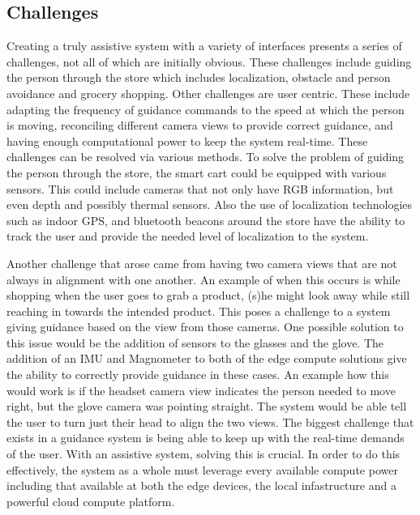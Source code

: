 \subsection{Challenges}
Creating a truly assistive system with a variety of interfaces presents a series 
of challenges, not all of which are initially obvious. These challenges include guiding the person
through the store which includes localization, obstacle and person avoidance and grocery shopping. 
Other challenges are user centric. These include adapting the frequency of guidance commands to the speed at which the person is moving, 
reconciling different camera views to provide correct guidance, and having enough computational power to keep the system real-time. 
These challenges can be resolved via various methods. To solve the problem of guiding the person through the store, the smart cart could be equipped with various sensors. 
This could include cameras that not only have RGB information, but even depth and possibly thermal sensors. 
Also the use of localization technologies such as indoor GPS, and bluetooth beacons around the store have the ability to track the user and 
provide the needed level of localization to the system.

Another challenge that arose came from having two camera views that are not always in alignment with one another. An example of when this occurs is 
while shopping when the user goes to grab a product, (s)he might look away while still reaching in towards the intended product. 
This poses a challenge to a system giving guidance based on the view from those cameras. One possible solution to this issue would be the addition of sensors 
to the glasses and the glove. The addition of an IMU and Magnometer to both of the edge compute solutions give the ability to correctly provide guidance in these cases. 
An example how this would work is if the headset camera view indicates the person needed to move right, 
but the glove camera was pointing straight. The system would be able tell the user to turn just their head to align the two views.
The biggest challenge that exists in a guidance system is being able to keep up with the real-time demands of the user. With an assistive system, 
solving this is crucial. In order to do this effectively, the system as a whole must leverage every available compute power 
including that available at both the edge devices, the local infastructure and a powerful cloud compute platform. 


